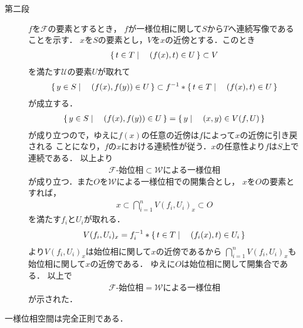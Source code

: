 \begin{sketch}
\begin{description}
			\item[第二段]
				$f$を$\mathscr{F}$の要素とするとき，
				$f$が一様位相に関して$S$から$T$へ連続写像であることを示す．
				$x$を$S$の要素とし，$V$を$x$の近傍とする．このとき
				\begin{align}
					\left\{\, t \in T \mid \quad (f(x),t) \in U\, \right\} \subset V
				\end{align}
				を満たす$\mathscr{U}$の要素$U$が取れて
				\begin{align}
					\left\{\, y \in S \mid \quad (f(x),f(y)) \in U\, \right\}
					\subset f^{-1} \ast \left\{\, t \in T \mid \quad (f(x),t) \in U\, \right\}
				\end{align}
				が成立する．
				\begin{align}
					\left\{\, y \in S \mid \quad (f(x),f(y)) \in U\, \right\}
					= \left\{\, y \mid \quad (x,y) \in V(f,U)\, \right\}
				\end{align}
				が成り立つので，ゆえに$f(x)$の任意の近傍は$f$によって$x$の近傍に引き戻される
				ことになり，$f$の$x$における連続性が従う．$x$の任意性より$f$は$S$上で連続である．
				以上より
				\begin{align}
					\mbox{$\mathscr{F}$-始位相}
					\subset \mbox{$\mathscr{W}$による一様位相}
				\end{align}
				が成り立つ．また$O$を$\mathscr{W}$による一様位相での開集合とし，
				$x$を$O$の要素とすれば，
				\begin{align}
					x \subset \bigcap_{i=1}^n V(f_i,U_i)_x \subset O
				\end{align}
				を満たす$f_i$と$U_i$が取れる．
				\begin{align}
					V(f_i,U_i)_x = f_i^{-1} \ast \left\{\, t \in T \mid \quad (f_i(x),t) \in U_i\, \right\}
				\end{align}
				より$V(f_i,U_i)_x$は始位相に関して$x$の近傍であるから
				$\bigcap_{i=1}^n V(f_i,U_i)_x$も始位相に関して$x$の近傍である．
				ゆえに$O$は始位相に関して開集合である．
				以上で
				\begin{align}
					\mbox{$\mathscr{F}$-始位相}
					= \mbox{$\mathscr{W}$による一様位相}
				\end{align}
				が示された．
				\QED
		\end{description}
	\end{sketch}
	
	\begin{screen}
		\begin{thm}[一様位相空間は完全正則]
			一様位相空間は完全正則である．
		\end{thm}
	\end{screen}
	
	\begin{screen}
		\begin{thm}[可算な基本近縁系を持つ一様位相空間はパラコンパクト]
		\end{thm}
	\end{screen}
	
